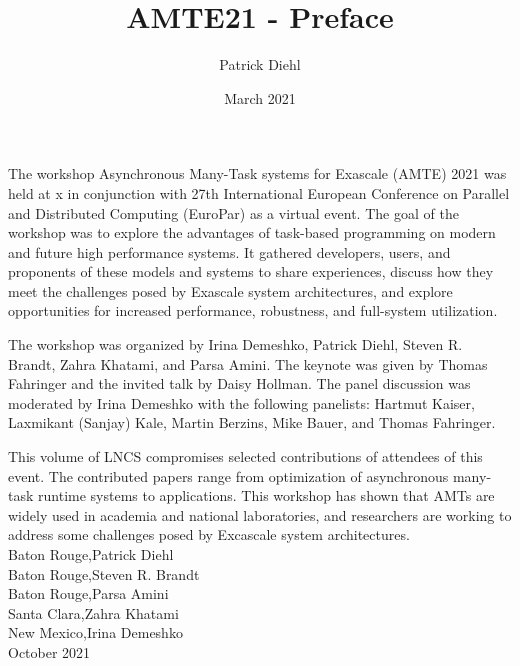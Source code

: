 \documentclass{article}
\title{AMTE21 - Preface}
\author{Patrick Diehl}
\date{March 2021}
\begin{document}
\noindent The workshop Asynchronous Many-Task systems for Exascale (AMTE) 2021 was held at x in conjunction with 27th International European Conference on Parallel and Distributed Computing (EuroPar) as a virtual event. The goal of the workshop was to explore the advantages of task-based programming on modern and future high performance systems. It gathered developers, users, and proponents of these models and systems to share experiences, discuss how they meet the challenges posed by Exascale system architectures, and explore opportunities for increased performance, robustness, and full-system utilization.

The workshop was organized by Irina Demeshko, Patrick Diehl, Steven R. Brandt, Zahra Khatami, and Parsa Amini. The keynote was given by Thomas Fahringer and the invited talk by Daisy Hollman. The panel discussion was moderated by Irina Demeshko with the following panelists: Hartmut Kaiser, Laxmikant (Sanjay) Kale, Martin Berzins, Mike Bauer, and Thomas Fahringer.

This volume of LNCS compromises selected contributions of attendees of this event. The contributed papers range from optimization of asynchronous many-task runtime systems to applications. This workshop has shown that AMTs are widely used in academia and national laboratories, and researchers are working to address some challenges posed by Excascale system architectures.\\

\noindent
Baton Rouge,\hfill Patrick Diehl\\
Baton Rouge,\hfill Steven R. Brandt\\
Baton Rouge,\hfill Parsa Amini\\
Santa Clara,\hfill Zahra Khatami\\
New Mexico,\hfill Irina Demeshko\\
October 2021
\end{document}

